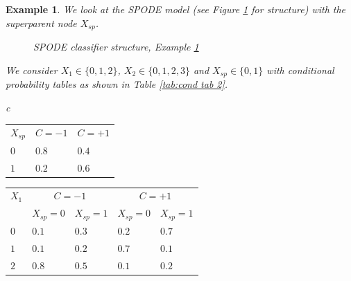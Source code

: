 \documentclass[11pt,a4paper, twoside]{book}
\newtheorem{example}{Example}[chapter]
\begin{document}
\begin{example}
\label{exp:2}
We look at the SPODE model (see Figure \ref{fig:exmpl SPODE} for structure) with the superparent node $X_{sp}$.
\begin{figure}[p]
\centering
{}  
\caption{SPODE classifier structure, Example \ref{exp:2}}
\label{fig:exmpl SPODE}
\end{figure}
We consider $X_1 \in \{0,1,2\}$, $X_2 \in \{0,1,2,3\}$ and $X_{sp}\in \{0,1\}$ with  conditional probability tables as shown in Table \ref{tab:cond tab 2}.
\begin{table}[p]
\centering
  \begin{tabular}{c}
  
    \begin{tabular}{|l|l|l|}
    \hline
    $X_{sp}$ & $C=-1$ & $C=+1$ \\ \cline{1-3}
    $0$ & $0.8$    & $0.4$    \\ \cline{1-3}
    $1$ & $0.2$    & $0.6$    \\ \cline{1-3}
    \end{tabular}
  
    
    \begin{tabular}{|l|l|l|l|l|}
    \hline
    $X_1$ & \multicolumn{2}{c|}{$C=-1$}  & \multicolumn{2}{c|}{$C=+1$ }   \\ \cline{1-5}
        &  $X_{sp}=0$  &  $X_{sp}=1$ &  $X_{sp}=0$  &  $X_{sp}=1$  \\ \hline    
    $0$ & $0.1$  & $0.3$ & $0.2$ & $0.7$    \\ \hline
    $1$ & $0.1$  & $0.2$ & $0.7$ & $0.1$    \\ \hline
    $2$ & $0.8$  & $0.5$ & $0.1$ & $0.2$    \\ \hline
    \end{tabular}
    

\end{tabular}
\end{table}
\end{example}
\end{document}
